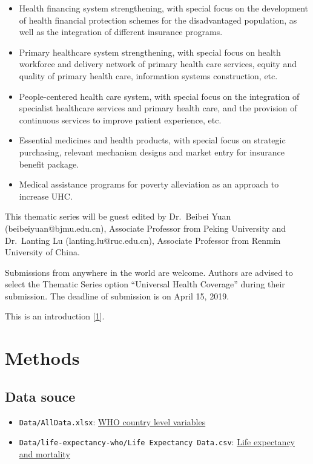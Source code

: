 \documentclass[]{elsarticle} %
\providecommand{\tightlist}{%
  \setlength{\itemsep}{0pt}\setlength{\parskip}{0pt}}
\begin{document}
\begin{itemize}
\item
  Health financing system strengthening, with special focus on the development of health financial protection schemes for the disadvantaged population, as well as the integration of different insurance programs.
\item
  Primary healthcare system strengthening, with special focus on health workforce and delivery network of primary health care services, equity and quality of primary health care, information systems construction, etc.
\item
  People-centered health care system, with special focus on the integration of specialist healthcare services and primary health care, and the provision of continuous services to improve patient experience, etc.
\item
  Essential medicines and health products, with special focus on strategic purchasing, relevant mechanism designs and market entry for insurance benefit package.
\item
  Medical assistance programs for poverty alleviation as an approach to increase UHC.
\end{itemize}

This thematic series will be guest edited by Dr.~Beibei Yuan (beibeiyuan@bjmu.edu.cn), Associate Professor from Peking University and Dr.~Lanting Lu (lanting.lu@ruc.edu.cn), Associate Professor from Renmin University of China.

Submissions from anywhere in the world are welcome. Authors are advised to select the Thematic Series option ``Universal Health Coverage'' during their submission. The deadline of submission is on April 15, 2019.

This is an introduction {[}\protect\hyperlink{ref-wagstaff2018progress}{1}{]}.

\hypertarget{methods}{%
\section{Methods}\label{methods}}

\hypertarget{data-souce}{%
\subsection{Data souce}\label{data-souce}}

\begin{itemize}
\tightlist
\item
  \texttt{Data/AllData.xlsx}: \href{http://apps.who.int/nha/database/Select/Indicators/en}{WHO country level variables}
\item
  \texttt{Data/life-expectancy-who/Life\ Expectancy\ Data.csv}: \href{https://www.kaggle.com/kumarajarshi/life-expectancy-who/data}{Life expectancy and mortality}
\end{itemize}
\end{document}
